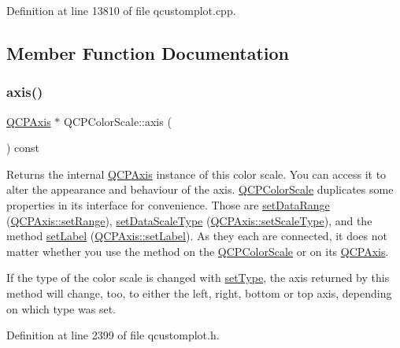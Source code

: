 Definition at line 13810 of file qcustomplot.\+cpp.



\subsection{Member Function Documentation}
\mbox{\label{class_q_c_p_color_scale_a39bdbdb3b212602a5a57f9f3ea444190}} 
\subsubsection{\texorpdfstring{axis()}{axis()}}
{\footnotesize\ttfamily \hyperlink{class_q_c_p_axis}{Q\+C\+P\+Axis} $\ast$ Q\+C\+P\+Color\+Scale\+::axis (\begin{DoxyParamCaption}{ }\end{DoxyParamCaption}) const\hspace{0.3cm}{\ttfamily [inline]}}

Returns the internal \hyperlink{class_q_c_p_axis}{Q\+C\+P\+Axis} instance of this color scale. You can access it to alter the appearance and behaviour of the axis. \hyperlink{class_q_c_p_color_scale}{Q\+C\+P\+Color\+Scale} duplicates some properties in its interface for convenience. Those are \hyperlink{class_q_c_p_color_scale_abe88633003a26d1e756aa74984587fef}{set\+Data\+Range} (\hyperlink{class_q_c_p_axis_aebdfea5d44c3a0ad2b4700cd4d25b641}{Q\+C\+P\+Axis\+::set\+Range}), \hyperlink{class_q_c_p_color_scale_aeb6107d67dd7325145b2498abae67fc3}{set\+Data\+Scale\+Type} (\hyperlink{class_q_c_p_axis_adef29cae617af4f519f6c40d1a866ca6}{Q\+C\+P\+Axis\+::set\+Scale\+Type}), and the method \hyperlink{class_q_c_p_color_scale_aee124ae8396320cacf8276e9a0fbb8ce}{set\+Label} (\hyperlink{class_q_c_p_axis_a33bcc382c111c9f31bb0687352a2dea4}{Q\+C\+P\+Axis\+::set\+Label}). As they each are connected, it does not matter whether you use the method on the \hyperlink{class_q_c_p_color_scale}{Q\+C\+P\+Color\+Scale} or on its \hyperlink{class_q_c_p_axis}{Q\+C\+P\+Axis}.

If the type of the color scale is changed with \hyperlink{class_q_c_p_color_scale_a1bf9bdb291927c422dd66b404b206f1f}{set\+Type}, the axis returned by this method will change, too, to either the left, right, bottom or top axis, depending on which type was set. 

Definition at line 2399 of file qcustomplot.\+h.

